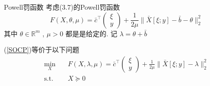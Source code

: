\documentclass[slidestop,compress,mathserif,UTF8]{beamer}
\numberwithin{equation}{section}                                %
\begin{document}
            \begin{frame}[t]{Powell罚函数}
                考虑(3.7)的Powell罚函数
                \begin{equation}\label{Powell}
                        F(X, \theta, \mu)
                    =	\bar{c}^\top \begin{pmatrix}\xi \\ y\end{pmatrix} + \frac{1}{2\mu} \lVert{\bar{X}[\xi; y] - \bar{b}- \theta}\rVert^2_2
                \end{equation}
                其中 $\theta \in \mathbb{R}^{m}$ , $\mu > 0$ 都是是给定的. 记 $\lambda = \theta + \bar{b}$

                (\ref{SOCP})等价于以下问题
                \begin{equation}
                    \begin{split}\label{PowellQ}
                        \min_{X} \quad
                            & F(X, \lambda, \mu) = \bar{c}^\top \begin{pmatrix}\xi \\ y\end{pmatrix} + \frac{1}{2\mu} \lVert{\bar{X}[\xi; y] - \lambda}\rVert^2_2\\
                        \text{s.t.} \quad
                            & X \succeq 0
                    \end{split}
                \end{equation} 
            \end{frame}
\end{document}
